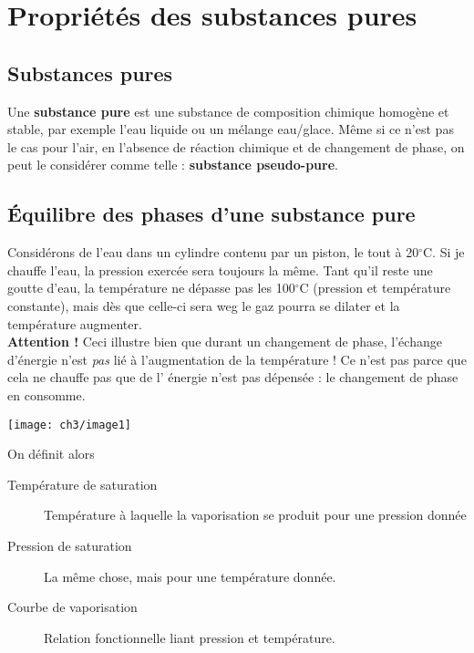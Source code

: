 \chapter{Propriétés des substances pures} 
\section{Substances pures}
Une \textbf{substance pure} est une substance de composition chimique 
homogène et stable, par exemple l'eau liquide ou un mélange eau/glace. 
Même si ce n'est pas le cas pour l'air, en l'absence de réaction 
chimique et de changement de phase, on peut le considérer comme telle 
: \textbf{substance pseudo-pure}.

\section{Équilibre des phases d'une substance pure}
Considérons de l'eau dans un cylindre contenu par un piston, le tout à 
20$^\circ$C. Si je chauffe l'eau, la pression exercée sera toujours la 
même. Tant qu'il reste une goutte d'eau, la température ne dépasse pas 
les 100$^\circ$C (pression et température constante), mais dès que 
celle-ci sera weg le gaz pourra se dilater et la température augmenter.\\

\noindent
\textbf{Attention !} Ceci illustre bien que durant un changement de 
phase, l'échange d'énergie n'est \textit{pas} lié à l'augmentation de 
la température ! Ce n'est pas parce que cela ne chauffe pas que de l'
énergie n'est pas dépensée : le changement de phase en consomme.

\begin{center}
\texttt{[image: ch3/image1]}
\end{center}

On définit alors
\begin{description}
\item[Température de saturation] Température à laquelle la vaporisation 
se produit pour une pression donnée
\item[Pression de saturation] La même chose, mais pour une température 
donnée.
\item[Courbe de vaporisation] Relation fonctionnelle liant pression et 
température.
\end{description}


